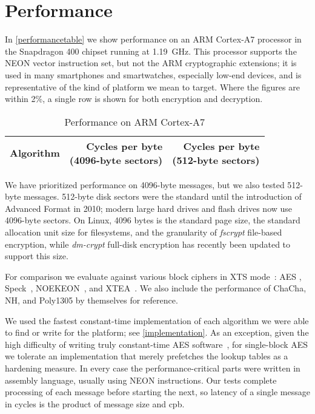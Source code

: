 \documentclass[eprint.tex]{subfiles}
\begin{document}
\section{Performance}\label{performance}

In \autoref{performancetable} we
show performance on an ARM \mbox{Cortex-A7}
processor in the Snapdragon 400 chipset running at \mbox{1.19 GHz}.  This
processor supports the NEON vector instruction set, but not the ARM cryptographic
extensions; it is used in many smartphones and smartwatches, especially low-end
devices, and is representative of the kind of platform we mean to target.
Where the figures are within 2\%, a single row is shown for both encryption and
decryption.

\begin{table}
    \caption{Performance on ARM Cortex-A7}
    \label{performancetable}
    \centering
    \begin{tabular}{lrr}
        \toprule
        Algorithm &
            \makecell{Cycles per byte \\ (4096-byte sectors)} &
            \makecell{Cycles per byte \\ (512-byte sectors)} \\
    \midrule
    
    \bottomrule
    \end{tabular}
\end{table}

We have prioritized performance on 4096-byte messages, but we also tested 512-byte messages.
512-byte disk sectors were the standard until the introduction of Advanced Format in 2010;
modern large hard drives and flash drives now use 4096-byte sectors.
On Linux, 4096 bytes is the standard page size, the standard allocation unit size for filesystems,
and the granularity of \textit{fscrypt} file-based encryption, while
\mbox{\textit{dm-crypt}} full-disk encryption has recently been updated
to support this size.

For comparison we evaluate against various block ciphers in XTS mode~\cite{xts}:
AES \cite{AES}, Speck~\cite{speck1,speck2,speck3}, NOEKEON~\cite{noekeon},
and XTEA~\cite{xtea}. We also include the performance of ChaCha, NH,
and Poly1305 by themselves for reference.

We used the fastest constant-time implementation of each algorithm we were able
to find or write for the platform; see \autoref{implementation}.  As an
exception, given the high difficulty of writing truly constant-time AES
software~\cite{aes-cache-timing}, for single-block AES we tolerate an
implementation that merely prefetches the lookup tables as a hardening measure.
In every case the performance-critical parts were written in assembly language,
usually using NEON instructions.  Our tests complete processing of each message
before starting the next, so latency of a single message in cycles is the
product of message size and cpb.
\end{document}
